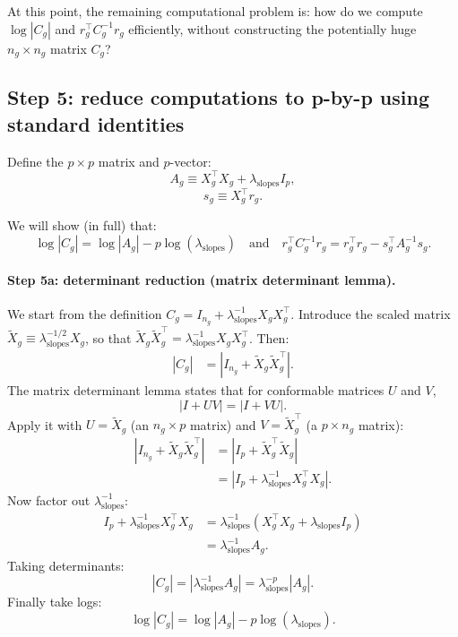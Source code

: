 \documentclass[11pt]{article}
\begin{document}
At this point, the remaining computational problem is: how do we compute $\log|C_g|$ and $r_g^\top C_g^{-1}r_g$
efficiently, without constructing the potentially huge $n_g\times n_g$ matrix $C_g$?

\subsection{Step 5: reduce computations to p-by-p using standard identities}

Define the $p\times p$ matrix and $p$-vector:
\[
  A_g \equiv X_g^\top X_g + \lambda_{\mathrm{slopes}} I_p,
\]
\[
  s_g \equiv X_g^\top r_g.
\]

We will show (in full) that:
\[
  \log|C_g| = \log|A_g| - p\log(\lambda_{\mathrm{slopes}})
  \quad\text{and}\quad
  r_g^\top C_g^{-1}r_g = r_g^\top r_g - s_g^\top A_g^{-1}s_g.
\]

\paragraph{Step 5a: determinant reduction (matrix determinant lemma).}
We start from the definition $C_g = I_{n_g} + \lambda_{\mathrm{slopes}}^{-1}X_gX_g^\top$.
Introduce the scaled matrix $\tilde{X}_g \equiv \lambda_{\mathrm{slopes}}^{-1/2}X_g$, so that
$\tilde{X}_g\tilde{X}_g^\top = \lambda_{\mathrm{slopes}}^{-1}X_gX_g^\top$. Then:
\begin{align*}
  |C_g|
  &= \left|I_{n_g} + \tilde{X}_g\tilde{X}_g^\top\right|.
\end{align*}
The matrix determinant lemma states that for conformable matrices $U$ and $V$,
\[
  |I + UV| = |I + VU|.
\]
Apply it with $U=\tilde{X}_g$ (an $n_g\times p$ matrix) and $V=\tilde{X}_g^\top$ (a $p\times n_g$ matrix):
\begin{align*}
  \left|I_{n_g} + \tilde{X}_g\tilde{X}_g^\top\right|
  &= \left|I_p + \tilde{X}_g^\top\tilde{X}_g\right| \\
  &= \left|I_p + \lambda_{\mathrm{slopes}}^{-1}X_g^\top X_g\right|.
\end{align*}
Now factor out $\lambda_{\mathrm{slopes}}^{-1}$:
\begin{align*}
  I_p + \lambda_{\mathrm{slopes}}^{-1}X_g^\top X_g
  &= \lambda_{\mathrm{slopes}}^{-1}\left(X_g^\top X_g + \lambda_{\mathrm{slopes}} I_p\right) \\
  &= \lambda_{\mathrm{slopes}}^{-1}A_g.
\end{align*}
Taking determinants:
\[
  |C_g| = \left|\lambda_{\mathrm{slopes}}^{-1}A_g\right| = \lambda_{\mathrm{slopes}}^{-p}|A_g|.
\]
Finally take logs:
\[
  \log|C_g| = \log|A_g| - p\log(\lambda_{\mathrm{slopes}}).
\]
\end{document}
